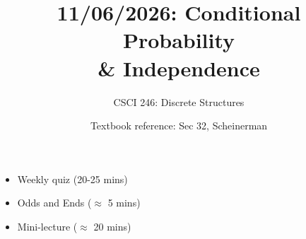 \documentclass[10pt]{beamer}
\begin{document}




\title{11/06/2026: Conditional Probability \\ \qquad \qquad \qquad \& Independence }
\author{CSCI 246: Discrete Structures}
\date{Textbook reference: Sec 32, Scheinerman}

\begin{frame}
    \titlepage 
\end{frame}


\begin{frame}


\begin{myyellowbox}[title=Today's Agenda]
\begin{itemize}
	\item Weekly quiz (20-25 mins)
	\item Odds and Ends ($\approx$ 5 mins)
	\item Mini-lecture ($\approx$ 20 mins)
\end{itemize}

\end{myyellowbox}

\end{frame}
\end{document}
